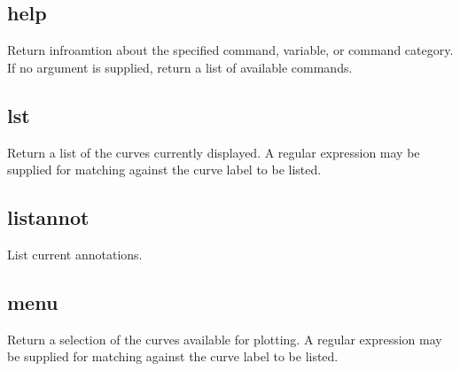 \documentclass[letterpaper,10pt,english]{sphinxmanual}
\begin{document}
\subsection{help}
\label{\detokenize{env_inquiry_cmds:help}}
Return infroamtion about the specified command, variable, or command category. If no argument is supplied, return a list of available commands.

\begin{sphinxVerbatim}[commandchars=\\\{\}]
\PYG{p}{[}\PYG{p}{]}  \PYG{p}{[}\PYG{p}{]}
\end{sphinxVerbatim}


\subsection{lst}
\label{\detokenize{env_inquiry_cmds:lst}}
Return a list of the curves currently displayed. A regular expression may be supplied for matching against the curve label to be listed.

\begin{sphinxVerbatim}[commandchars=\\\{\}]
\PYG{p}{[}\PYG{p}{]}  
\end{sphinxVerbatim}


\subsection{listannot}
\label{\detokenize{env_inquiry_cmds:listannot}}
List current annotations.

\begin{sphinxVerbatim}[commandchars=\\\{\}]
\PYG{p}{[}\PYG{p}{]} 
\end{sphinxVerbatim}


\subsection{menu}
\label{\detokenize{env_inquiry_cmds:menu}}
Return a selection of the curves available for plotting. A regular expression may be supplied for matching against the curve label to be listed.

\begin{sphinxVerbatim}[commandchars=\\\{\}]
\PYG{p}{[}\PYG{p}{]}  
\end{sphinxVerbatim}
\end{document}
